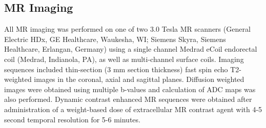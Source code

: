 \subsection{MR Imaging}
All MR imaging was performed on one of two 3.0 Tesla MR scanners (General
Electric HDx, GE Healthcare, Waukesha, WI;  Siemens Skyra, Siemens Healthcare,
Erlangan, Germany) using a single channel Medrad eCoil endorectal coil (Medrad,
Indianola, PA), as well as multi-channel surface coils.  Imaging sequences
included thin-section (3 mm section thickness) fast spin echo T2-weighted
images in the coronal, axial and sagittal planes.  Diffusion weighted images
were obtained using multiple b-values and calculation of ADC maps was also
performed.  Dynamic contrast enhanced MR sequences were obtained after
administration of a weight-based dose of extracellular MR contrast agent with
4-5 second temporal resolution for 5-6 minutes.

